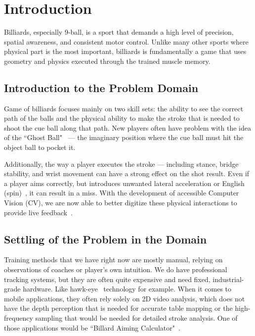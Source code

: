 \chapter{Introduction}

Billiards, especially 9-ball, is a sport that demands a high level of precision, spatial awareness, and consistent motor control. Unlike many other sports where physical part is the most important, billiards is fundamentally a game that uses geometry and physics executed through the trained muscle memory.

\section{Introduction to the Problem Domain}

Game of billiards focuses mainly on two skill sets: the ability to see the correct path of the balls and the physical ability to make the stroke that is needed to shoot the cue ball along that path. New players often have problem with the idea of the ``Ghost Ball"~\cite{bib:ghost-ball} --- the imaginary position where the cue ball must hit the object ball to pocket it.

Additionally, the way a player executes the stroke --- including stance, bridge stability, and wrist movement can have a strong effect on the shot result. Even if a player aims correctly, but introduces unwanted lateral acceleration or English (spin)~\cite{bib:english}, it can result in a miss. With the development of accessible Computer Vision (CV), we are now able to better digitize these physical interactions to provide live feedback~\cite{bib:cv-in-sports}.

\section{Settling of the Problem in the Domain}
Training methods that we have right now are mostly manual, relying on observations of coaches or player's own intuition. We do have professional tracking systems, but they are often quite expensive and need fixed, industrial-grade hardware. Like hawk-eye~\cite{bib:hawk-eye} technology for example. When it comes to mobile applications, they often rely solely on 2D video analysis, which does not have the depth perception that is needed for accurate table mapping or the high-frequency sampling that would be needed for detailed stroke analysis. One of those applications would be ``Billard Aiming Calculator"~\cite{bib:calc-app}.

